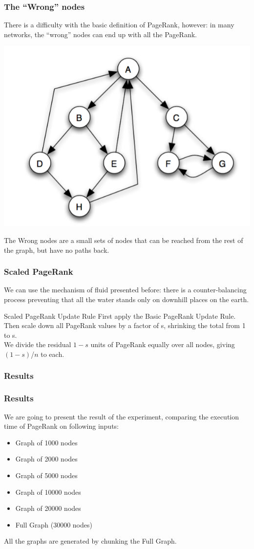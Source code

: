 \documentclass{beamer}
\begin{document}
\begin{frame}
\frametitle{The ``Wrong'' nodes}
There is a difficulty with the basic definition of PageRank, however: in many networks, the “wrong” nodes can end up with all the PageRank.
\begin{center} 
\includegraphics[scale=0.2]{img/wrong_nodes.png} 
\end{center}
The Wrong nodes are a small sets of nodes that can be reached from the rest of the graph, but have no paths back.
\end{frame}

\begin{frame}
\frametitle{Scaled PageRank }
We can use the mechanism of fluid presented before: there is a \alert{counter-balancing process} preventing that all the water stands only on downhill places on the earth.
\begin{block}{Scaled PageRank Update Rule}
First apply the Basic PageRank Update Rule.\\ 
\smallskip
Then scale down all PageRank values by a factor of s, shrinking the total from 1 to s. \\
\smallskip
We divide the residual $1 - s$ units of PageRank equally over all nodes, giving$ (1 - s)$/$n$ to each.
\end{block}
\end{frame}

\subsubsection{Results}
\begin{frame}
\frametitle{Results}
We are going to present the result of the experiment, comparing the \alert{execution time} of PageRank on following inputs:
\begin{itemize}
\item Graph of 1000 nodes
\item Graph of 2000 nodes
\item Graph of 5000 nodes
\item Graph of 10000 nodes
\item Graph of 20000 nodes
\item Full Graph (30000 nodes) 
\end{itemize}
All the graphs are generated by chunking the Full Graph.
\end{frame}
\end{document}
